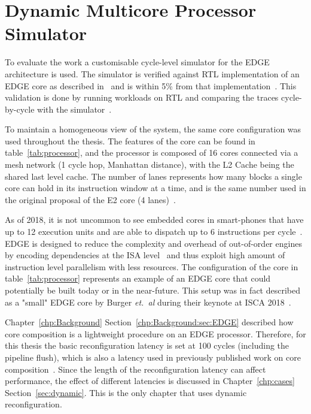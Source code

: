 \section{Dynamic Multicore Processor Simulator}\label{chp:setup:conf}

To evaluate the work a customisable cycle-level simulator for the EDGE architecture is used.
The simulator is verified against RTL implementation of an EDGE core as described in~\cite{putnam2010e2} and is within 5\% from that implementation~\cite{micolet2016dmpstream}.
This validation is done by running workloads on RTL and comparing the traces cycle-by-cycle with the simulator~\cite{micolet2017cases}.

To maintain a homogeneous view of the system, the same core configuration was used throughout the thesis.
The features of the core can be found in table~\ref{tab:processor}, and the processor is composed of 16 cores connected via a mesh network (1 cycle hop, Manhattan distance), with the L2 Cache being the shared last level cache.
The number of lanes represents how many blocks a single core can hold in its instruction window at a time, and is the same number used in the original proposal of the E2 core (4 lanes)~\cite{putnam2010e2}.

As of 2018, it is not uncommon to see embedded cores in smart-phones that have up to 12 execution units and are able to dispatch up to 6 instructions per cycle~\cite{samsung2018,apple}.
EDGE is designed to reduce the complexity and overhead of out-of-order engines by encoding dependencies at the ISA level~\cite{kim2007tflex,gray2018edge} and thus exploit high amount of instruction level parallelism with less resources.
The configuration of the core in table~\ref{tab:processor} represents an example of an EDGE core that could potentially be built today or in the near-future.
This setup was in fact described as a "small" EDGE core by Burger {\it et.~al} during their keynote at ISCA 2018~\cite{iscakeynote,e2thereg,twitter}.

Chapter~\ref{chp:Background} Section~\ref{chp:Background:sec:EDGE} described how core composition is a lightweight procedure on an EDGE processor.
Therefore, for this thesis the basic reconfiguration latency is set at 100 cycles (including the pipeline flush), which is also a latency used in previously published work on core composition~\cite{pricopi2012bahurupi}.
Since the length of the reconfiguration latency can affect performance, the effect of different latencies is discussed in Chapter~\ref{chp:cases} Section~\ref{sec:dynamic}.
This is the only chapter that uses dynamic reconfiguration.
 
